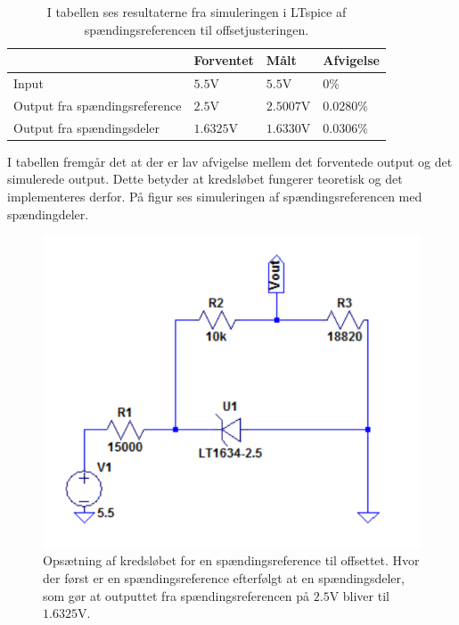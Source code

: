\begin{table}[]
\centering
\caption{I tabellen ses resultaterne fra simuleringen i LTspice af spændingsreferencen til offsetjusteringen.}
\label{Tab:SpaendigsRef_offset}
\begin{tabular}{|l|l|l|l|}
\hline
                              & Forventet & Målt & Afvigelse \\ \hline
Input                         & $5.5$V    &   $5.5$V   &   $0\%$         \\ \hline
Output fra spændingsreference & $2.5$V    &  $2.5007$V    &    $0.0280 \%$        \\ \hline
Output fra spændingsdeler     & $1.6325$V &  $1.6330$V     &       $0.0306 \%$     \\ \hline
\end{tabular}
\end{table}

I tabellen fremgår det at der er lav afvigelse mellem det forventede output og det simulerede output. Dette betyder at kredsløbet fungerer teoretisk og det implementeres derfor. På figur  ses simuleringen af spændingsreferencen med spændingdeler. 

\begin{figure}[H]
	\centering
	\includegraphics[scale=1.0]{figures/cProblemloesning/OffsetSpaendingsRef.PNG}
	\caption{Opsætning af kredsløbet for en spændingsreference til offsettet. Hvor der først er en spændingsreference efterfølgt at en spændingsdeler, som gør at outputtet fra spændingsreferencen på $2.5$V bliver til $1.6325$V. }
	\label{fig:Spaendingsreference_offset}
\end{figure}

